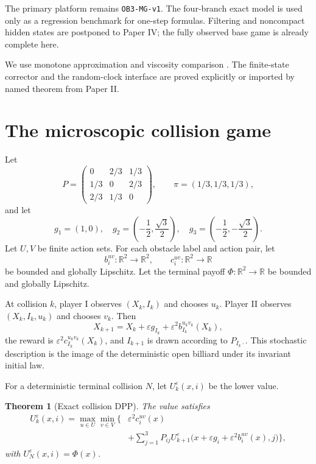 \documentclass[11pt,reqno]{amsart}
\newtheorem{theorem}{Theorem}[section]
\theoremstyle{definition}
\theoremstyle{remark}
\newcommand{\R}{\mathbb R}
\begin{document}
The primary platform remains \texttt{OB3-MG-v1}.  The four-branch exact model
is used only as a regression benchmark for one-step formulas.  Filtering and
noncompact hidden states are postponed to Paper IV; the fully observed base
game is already complete here.

We use monotone approximation and viscosity comparison
\cite{BarlesSouganidis1991,CrandallIshiiLions1992,FlemingSouganidis1989}.
The finite-state corrector and the random-clock interface are proved
explicitly or imported by named theorem from Paper II.

\section{The microscopic collision game}\label{sec:game}

Let
\[
 P=\begin{pmatrix}
 0&2/3&1/3\\
 1/3&0&2/3\\
 2/3&1/3&0
 \end{pmatrix},
 \qquad
 \pi=(1/3,1/3,1/3),
\]
and let
\[
 g_1=(1,0),\quad
 g_2=\left(-\frac12,\frac{\sqrt3}{2}\right),\quad
 g_3=\left(-\frac12,-\frac{\sqrt3}{2}\right).
\]
Let $U,V$ be finite action sets.  For each obstacle label and action pair, let
\[
 b_i^{uv}:\R^2\to\R^2,\qquad
 c_i^{uv}:\R^2\to\R
\]
be bounded and globally Lipschitz.  Let the terminal payoff
$\Phi:\R^2\to\R$ be bounded and globally Lipschitz.

At collision $k$, player I observes $(X_k,I_k)$ and chooses $u_k$.  Player II
observes $(X_k,I_k,u_k)$ and chooses $v_k$.  Then
\begin{equation}\label{eq:slow}
 X_{k+1}
 =
 X_k+\varepsilon g_{I_k}
 +\varepsilon^2 b_{I_k}^{u_kv_k}(X_k),
\end{equation}
the reward is $\varepsilon^2c_{I_k}^{u_kv_k}(X_k)$, and
$I_{k+1}$ is drawn according to $P_{I_k\cdot}$.  This stochastic description
is the image of the deterministic open billiard under its invariant initial
law.

For a deterministic terminal collision $N$, let
$U_k^\varepsilon(x,i)$ be the lower value.

\begin{theorem}[Exact collision DPP]\label{thm:dpp}
The value satisfies
\begin{equation}\label{eq:dpp}
\begin{aligned}
 U_k^\varepsilon(x,i)
 =
 \max_{u\in U}\min_{v\in V}
 \Bigg\{&
 \varepsilon^2c_i^{uv}(x)\\
 &+\sum_{j=1}^3P_{ij}
 U_{k+1}^\varepsilon
 \bigl(x+\varepsilon g_i+\varepsilon^2b_i^{uv}(x),j\bigr)
 \Bigg\},
\end{aligned}
\end{equation}
with $U_N^\varepsilon(x,i)=\Phi(x)$.
\end{theorem}
\end{document}
